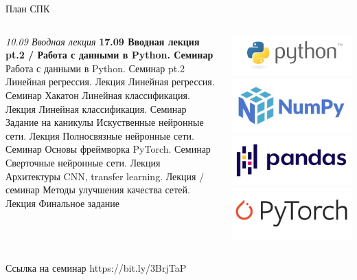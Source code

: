 \documentclass[aspectratio=169, professionalfonts]{beamer}
\begin{document}
\begin{frame}{План СПК}
    \begin{columns}
        \begin{column}{.5\linewidth}
            {\tiny
                \begin{outline}
                    \1 \textit{10.09 Вводная лекция}
                    \1 \textbf{17.09 Вводная лекция pt.2 / Работа с данными в Python. Семинар}
                     Работа с данными в Python. Семинар pt.2
                     Линейная регрессия. Лекция
                     Линейная регрессия. Семинар
                     Хакатон
                     Линейная классификация. Лекция
                     Линейная классификация. Семинар
                    \1 Задание на каникулы
                     Искуственные нейронные сети. Лекция
                     Полносвязные нейронные сети. Семинар
                     Основы фреймворка PyTorch. Семинар
                     Сверточные нейронные сети. Лекция
                     Архитектуры CNN, transfer learning. Лекция / семинар
                     Методы улучшения качества сетей. Лекция
                     Финальное задание
                \end{outline}
            }
        \end{column}
        \begin{column}{.49\linewidth}
            \includegraphics[width=.55\linewidth]{graphs/fig8_1.jpg}
            \includegraphics[width=.55\linewidth]{graphs/fig8_2.jpg}
            \includegraphics[width=.55\linewidth]{graphs/fig8_3.jpg}
            \includegraphics[width=.55\linewidth]{graphs/fig8_4.jpg}
        \end{column}
    \end{columns}
\end{frame}

\begin{frame}{Ссылка на семинар}
    \centering
    \LARGE https://bit.ly/3BrjTaP
\end{frame}
\end{document}

